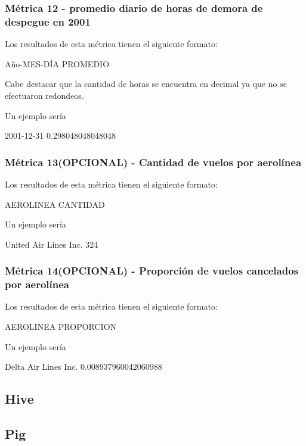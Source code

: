 \documentclass[a4paper,10pt]{article}
\begin{document}
 \subsubsection{Métrica 12 - promedio diario de horas de demora de despegue en 2001}
            Los resultados de esta métrica tienen el siguiente formato:\\
            \begin{center}
                Año-MES-DÍA PROMEDIO
            \end{center}
            Cabe destacar que la cantidad de horas se encuentra en decimal ya que no se efectuaron redondeos.

            Un ejemplo sería\\
            \begin{center}
                2001-12-31  0.298048048048048\\
            \end{center}

        \subsubsection{Métrica 13(OPCIONAL) - Cantidad de vuelos por aerolínea}
            Los resultados de esta métrica tienen el siguiente formato:\\
            \begin{center}
                AEROLINEA CANTIDAD\\
            \end{center}

            Un ejemplo sería\\
            \begin{center}
               United Air Lines Inc.   324\\
            \end{center}

         \subsubsection{Métrica 14(OPCIONAL) - Proporción de vuelos cancelados por aerolínea}
            Los resultados de esta métrica tienen el siguiente formato:\\
            \begin{center}
                AEROLINEA PROPORCION\\
            \end{center}

            Un ejemplo sería\\
            \begin{center}
               Delta Air Lines Inc.    0.008937960042060988\\
            \end{center}

    \subsection{Hive}

    \subsection{Pig}
\end{document}
